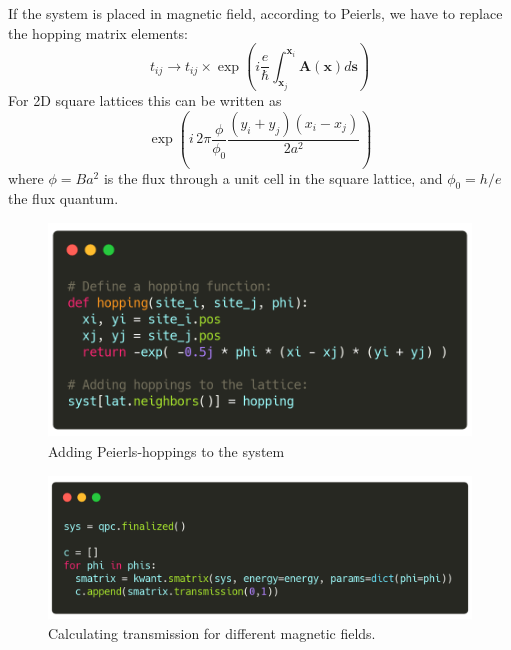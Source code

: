 \documentclass[12pt]{article}
\numberwithin{equation}{section}
\begin{document}
\newpage
If the system is placed in magnetic field, according to Peierls, we have to replace the hopping matrix elements:
\begin{equation*}
  t_{ij} \rightarrow t_{ij} \times \exp\left(i \frac{e}{\hbar} \int_{\mathbf{x}_j}^{\mathbf{x}_i} \mathbf{A}(\mathbf{x}) d\mathbf{s}\right)
\end{equation*}
For 2D square lattices this can be written as 
\begin{equation*}
  \exp\left(i\, 2 \pi \frac{\phi}{\phi_0} \frac{(y_i + y_j)(x_i-x_j)}{2a^2} \right)  
\end{equation*}
where $\phi = B a^2$ is the flux through a unit cell in the square lattice, and $\phi_0 = h/e$ the flux quantum. 

\newpage
\begin{figure}[h!]
  \begin{center}
  \includegraphics[height=0.55\textheight]{./media/example-peierls-code.png}
  \caption{Adding Peierls-hoppings to the system}
  \label{fig:peierls}
  \end{center}
\end{figure}

\begin{figure}[h!]
  \begin{center}
  \includegraphics[height=0.35\textheight]{./media/phi-calc-code.png}
  \caption{Calculating transmission for different magnetic fields.}
  \label{fig:phicalc}
  \end{center}
\end{figure}
\end{document}
